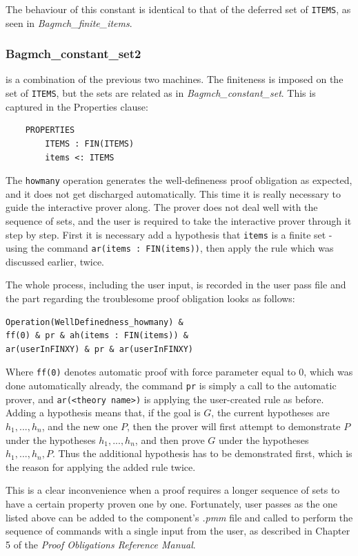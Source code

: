 \documentclass[11pt,journal]{IEEEtran}
\begin{document}
	The behaviour of this constant is identical to that of the deferred set of \texttt{ITEMS}, as seen in \emph{Bagmch\_finite\_items}.
	
	\subsubsection{Bagmch\_constant\_set2} is a combination of the previous two machines. The finiteness is imposed on the set of \texttt{ITEMS}, but the sets are related as in \emph{Bagmch\_constant\_set}. This is captured in the Properties clause:
	\begin{lstlisting}
	PROPERTIES
		ITEMS : FIN(ITEMS)
		items <: ITEMS 
	\end{lstlisting}
	The \texttt{howmany} operation generates the well-defineness proof obligation as expected, and it does not get discharged automatically. This time it is really necessary to guide the interactive prover along. The prover does not deal well with the sequence of sets, and the user is required to take the interactive prover through it step by step. First it is necessary add a hypothesis that \texttt{items} is a finite set - using the command \texttt{ar(items : FIN(items))}, then apply the rule which was discussed earlier, twice. 
	
	The whole process, including the user input, is recorded in the user pass file and the part regarding the troublesome proof obligation looks as follows:
	
	\begin{lstlisting}
Operation(WellDefinedness_howmany) & 
ff(0) & pr & ah(items : FIN(items)) &
ar(userInFINXY) & pr & ar(userInFINXY)
	\end{lstlisting}
	Where \texttt{ff(0)} denotes automatic proof with force parameter equal to 0, which was done automatically already, the command \texttt{pr} is simply a call to the automatic prover, and \texttt{ar(<theory name>)} is applying the user-created rule as before. Adding a hypothesis means that, if the goal is $G$, the current hypotheses are $h_1, ..., h_n$, and the new one $P$, then the prover will first attempt to demonstrate $P$ under the hypotheses $h_1, ..., h_n$, and then prove $G$ under the hypotheses $h_1, ...,h_n, P$.\cite{PO reference}  Thus the additional hypothesis has to be demonstrated first, which is the reason for applying the added rule twice. 
	
	This is a clear inconvenience when a proof requires a longer sequence of sets to have a certain property proven one by one. Fortunately, user passes as the one listed above can be added to the component's \emph{.pmm} file and called to perform the sequence of commands with a single input from the user, as described in Chapter 5 of the \emph{Proof Obligations Reference Manual}.
	
\end{document}
